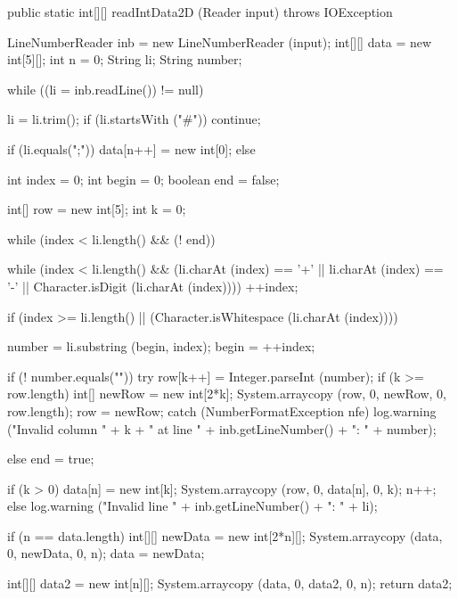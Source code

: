 \begin{code}

   public static int[][] readIntData2D (Reader input) throws IOException\begin{hide} {
      LineNumberReader inb = new LineNumberReader (input);
      int[][] data = new int[5][];
      int n = 0;
      String li;
      String number;

      while ((li = inb.readLine()) != null) {
         li = li.trim();
         if (li.startsWith ("#"))
            continue;

         if (li.equals(";")) {
            data[n++] = new int[0];
         }
         else {

            int index = 0;
            int begin = 0;
            boolean end = false;

            int[] row = new int[5];
            int k = 0;

            while (index < li.length() && (! end))
            {
               while (index < li.length() &&
                  (li.charAt (index) == '+' || li.charAt (index) == '-' ||
                   Character.isDigit (li.charAt (index))))
                  ++index;

               if (index >= li.length() || (Character.isWhitespace (li.charAt (index))))
               {
                  number = li.substring (begin, index);
                  begin = ++index;

                  if (! number.equals("")) {
                     try {
                        row[k++] = Integer.parseInt (number);
                        if (k >= row.length) {
                           int[] newRow = new int[2*k];
                           System.arraycopy (row, 0, newRow, 0, row.length);
                           row = newRow;
                        }
                     }
                     catch (NumberFormatException nfe) {
                        log.warning ("Invalid column " + k + " at line " + inb.getLineNumber() + ": " + number);
                     }
                  }
               }
               else {
                  end = true;
               }
            }

            if (k > 0) {
               data[n] = new int[k];
               System.arraycopy (row, 0, data[n], 0, k);
               n++;
            }
            else {
               log.warning ("Invalid line " + inb.getLineNumber() + ": " + li);
            }
         }

         if (n == data.length) {
            int[][] newData = new int[2*n][];
            System.arraycopy (data, 0, newData, 0, n);
            data = newData;
         }
      }

      int[][] data2 = new int[n][];
      System.arraycopy (data, 0, data2, 0, n);
      return data2;
   }\end{hide}
\end{code}
